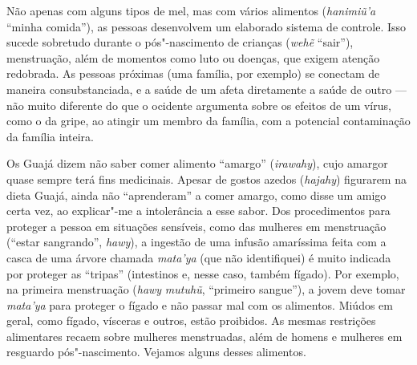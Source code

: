 Não apenas com alguns tipos de mel, mas com vários alimentos
(\emph{hanimiũ'a} ``minha comida''), as pessoas desenvolvem um elaborado
sistema de controle. Isso sucede sobretudo durante o pós"-nascimento de
crianças (\emph{wehẽ} ``sair''), menstruação, além de momentos como luto
ou doenças, que exigem atenção redobrada. As pessoas próximas (uma
família, por exemplo) se conectam de maneira consubstanciada, e a saúde
de um afeta diretamente a saúde de outro --- não muito diferente do que o
ocidente argumenta sobre os efeitos de um vírus, como o da gripe, ao
atingir um membro da família, com a potencial contaminação da família
inteira.

Os Guajá dizem não saber comer alimento ``amargo'' (\emph{irawahy}), cujo
amargor quase sempre terá fins medicinais. Apesar de gostos azedos
(\emph{hajahy}) figurarem na dieta Guajá, ainda não ``aprenderam'' a comer
amargo, como disse um amigo certa vez, ao explicar"-me a intolerância a
esse sabor. Dos procedimentos para proteger a pessoa em situações
sensíveis, como das mulheres em menstruação (``estar sangrando'',
\emph{hawy}), a ingestão de uma infusão amaríssima feita com a casca de
uma árvore chamada \emph{mata'ya} (que não identifiquei) é muito
indicada por proteger as ``tripas'' (intestinos e, nesse caso, também
fígado). Por exemplo, na primeira menstruação (\emph{hawy}
\emph{mutuhũ}, ``primeiro sangue''), a jovem deve tomar \emph{mata'ya}
para proteger o fígado e não passar mal com os alimentos. Miúdos em
geral, como fígado, vísceras e outros, estão proibidos. As mesmas
restrições alimentares recaem sobre mulheres menstruadas, além de homens
e mulheres em resguardo pós"-nascimento. Vejamos alguns desses alimentos.






